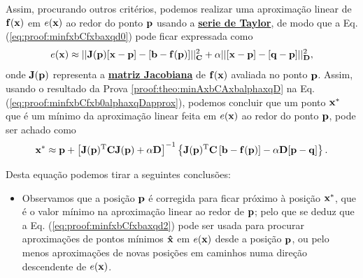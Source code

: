\begin{myproofT}
Assim, procurando outros critérios, podemos realizar uma aproximação linear de $\VECTOR{f}(\VECTOR{x})$ em $e(\VECTOR{x})$
ao redor do ponto $\VECTOR{p}$ usando a \hyperref[def:taylor]{\textbf{serie de Taylor}},
de modo que a Eq. (\ref{eq:proof:minfxbCfxbaxqd0}) pode ficar expressada como
\begin{equation}\label{eq:proof:minfxbCfxb0alphaxqDapprox}
e(\VECTOR{x}) \approx 
||\MATRIX{J}(\VECTOR{p})[\VECTOR{x}-\VECTOR{p}]-[\VECTOR{b}-\VECTOR{f}(\VECTOR{p})]||_{\MATRIX{C}}^2+
\alpha||[\VECTOR{x}-\VECTOR{p}]-[\VECTOR{q}-\VECTOR{p}]||_{\MATRIX{D}}^2,
\end{equation}
onde $\MATRIX{J}(\VECTOR{p})$ representa a \hyperref[def:jacobian]{\textbf{matriz Jacobiana}} 
de $\VECTOR{f}(\VECTOR{x})$ avaliada no ponto $\VECTOR{p}$.
Assim, usando o resultado da Prova \ref{proof:theo:minAxbCAxbalphaxqD} na Eq. (\ref{eq:proof:minfxbCfxb0alphaxqDapprox}), 
podemos concluir que um ponto $\VECTOR{x}^*$ que é 
um mínimo da aproximação linear feita em $e(\VECTOR{x})$ ao redor do ponto $\VECTOR{p}$,
pode ser achado como
\begin{equation}\label{eq:proof:minfxbCfxbaxqd2}
\VECTOR{x}^* \approx \VECTOR{p} +
\left[ \MATRIX{J}(\VECTOR{p})^{\transpose}\MATRIX{C} \MATRIX{J}(\VECTOR{p})+\alpha \MATRIX{D} \right]^{-1}
\left\{ \MATRIX{J}(\VECTOR{p})^{\transpose}\MATRIX{C} \left[\VECTOR{b}-\VECTOR{f}(\VECTOR{p})\right]-\alpha\MATRIX{D}[\VECTOR{p}-\VECTOR{q}]\right\}.
\end{equation}


Desta equação podemos tirar a seguintes conclusões:
\begin{itemize}

\item Observamos que a posição $\VECTOR{p}$ é corregida para ficar próximo à posição $\VECTOR{x}^*$, 
que é o valor mínimo na aproximação linear ao redor de $\VECTOR{p}$;
pelo que se deduz que a Eq. (\ref{eq:proof:minfxbCfxbaxqd2})
pode ser usada para procurar aproximações de pontos mínimos $\VECTOR{\hat{x}}$ em $e(\VECTOR{x})$ desde a posição $\VECTOR{p}$,
ou pelo menos aproximações de novas posições em caminhos numa direção descendente de $e(\VECTOR{x})$.

\end{itemize}
\end{myproofT}
